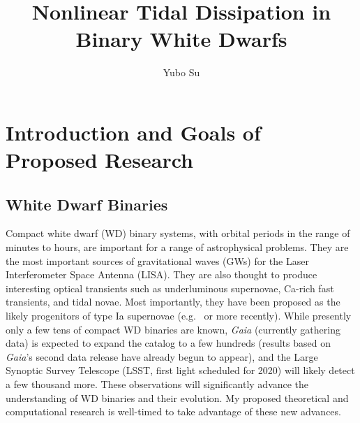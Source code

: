 \documentclass[12pt,
        usenames, %
        dvipsnames %
    ]{article}
\begin{document}
\renewcommand*{\sectionautorefname}{Section}

\singlespacing

\pagestyle{fancy}
\rhead{}
\cfoot{\thepage/\pageref{LastPage}}

\title{Nonlinear Tidal Dissipation in Binary White Dwarfs}
\author{Yubo Su}
\date{}

\maketitle

\section{Introduction and Goals of Proposed Research}\label{s:1}

\subsection{White Dwarf Binaries}

Compact white dwarf (WD) binary systems, with orbital periods in the range of
minutes to hours, are important for a range of astrophysical problems. They are
the most important sources of gravitational waves (GWs) for the Laser
Interferometer Space Antenna (LISA)\cite{lisa}. They are also thought to
produce interesting optical transients such as underluminous
supernovae\cite{underlum}, Ca-rich fast transients\cite{carich}, and tidal
novae\cite{tidal_novae}. Most importantly, they have been proposed as the likely
progenitors of type Ia supernovae (e.g.~\cite{Ia0,webbink} or more
recently\cite{Ia1,Ia2}). While presently only a few tens of compact WD binaries
are known\cite{lsst_wd}, \emph{Gaia} (currently gathering data) is expected to
expand the catalog to a few hundreds\cite{lsst_wd} (results based on
\emph{Gaia}'s second data release have already begun to
appear\cite{gaiaDD,gaiaDD2}), and the Large Synoptic Survey Telescope (LSST,
first light scheduled for 2020) will likely detect a few thousand
more\cite{lsst_wd}. These observations will significantly advance the
understanding of WD binaries and their evolution. My proposed theoretical and
computational research is well-timed to take advantage of these new advances.
\end{document}

